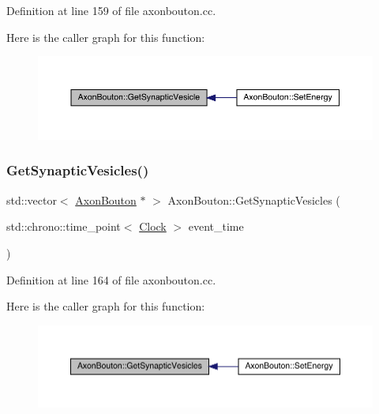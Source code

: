Definition at line 159 of file axonbouton.\+cc.

Here is the caller graph for this function\+:\nopagebreak
\begin{figure}[H]
\begin{center}
\leavevmode
\includegraphics[width=350pt]{class_axon_bouton_a847ab3d3d214ddc85bdfd463c6d95d54_icgraph}
\end{center}
\end{figure}
\mbox{\label{class_axon_bouton_af9a35ff7a6c32ac291021cccb3d40c9b}} 
\subsubsection{\texorpdfstring{Get\+Synaptic\+Vesicles()}{GetSynapticVesicles()}}
{\footnotesize\ttfamily std\+::vector$<$ \hyperlink{class_axon_bouton}{Axon\+Bouton} $\ast$ $>$ Axon\+Bouton\+::\+Get\+Synaptic\+Vesicles (\begin{DoxyParamCaption}\item[{std\+::chrono\+::time\+\_\+point$<$ \hyperlink{universe_8h_a0ef8d951d1ca5ab3cfaf7ab4c7a6fd80}{Clock} $>$}]{event\+\_\+time }\end{DoxyParamCaption})}



Definition at line 164 of file axonbouton.\+cc.

Here is the caller graph for this function\+:\nopagebreak
\begin{figure}[H]
\begin{center}
\leavevmode
\includegraphics[width=350pt]{class_axon_bouton_af9a35ff7a6c32ac291021cccb3d40c9b_icgraph}
\end{center}
\end{figure}
\mbox{\label{class_axon_bouton_a95fc006b2436e2c7784af2cc0bc9522e}} 
